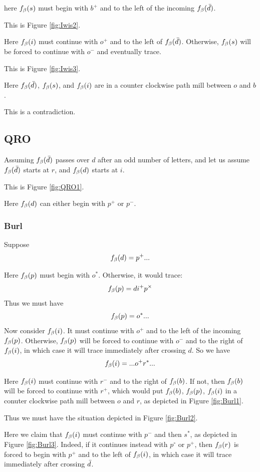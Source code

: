 here $f_\beta(s)$ must begin with $b^+$ and to the left of the incoming $f_\beta(\bar{d})$.

This is Figure \ref{fig:Iwis2}.

Here $f_\beta(i)$ must continue with $o^+$ and to the left of $f_\beta(\bar{d})$. Otherwise, $f_\beta(s)$ will be forced to continue with $o^-$ and eventually trace.

This is Figure \ref{fig:Iwis3}.

Here $f_\beta(\bar{d})$, $f_\beta(s)$, and $f_\beta(i)$ are in a counter clockwise path mill between $o$ and $b$.

This is a contradiction.


\subsection{QRO}\label{QRO}
Assuming $f_\beta(\bar{d})$ passes over $d$ after an odd number of letters, and let us assume $f_\beta(\bar{d})$ starts at $r$, and $f_\beta(d)$ starts at $i$.

This is Figure \ref{fig:QRO1}.

Here $f_\beta(d)$ can either begin with $p^+$ or $p^-$.

\subsubsection{Burl}\label{Burl}
Suppose 
\[
f_\beta(d) = p^+...
\]

Here $f_\beta(p)$ must begin with $o^*$. Otherwise, it would trace:
\[
f_\beta(p) = d i^+ p^\times
\]
Thus we must have
\[
f_\beta(p) = o^*...
\]
Now consider $f_\beta(i)$. It must continue with $o^+$ and to the left of the incoming $f_\beta(p)$. Otherwise, $f_\beta(p)$ will be forced to continue with $o^-$ and to the right of $f_\beta(i)$, in which case it will trace immediately after crossing $d$. So we have
\[
f_\beta(i) = ... o^+ r^*...
\]

Here $f_\beta(i)$ must continue with $r^-$ and to the right of $f_\beta(b)$. If not, then $f_\beta(b)$ will be forced to continue with $r^+$, which would put $f_\beta(b)$, $f_\beta(p)$, $f_\beta(i)$ in a conuter clockwise path mill between $o$ and $r$, as depicted in Figure \ref{fig:Burl1}.

Thus we must have the situation depicted in Figure \ref{fig:Burl2}.

Here we claim that $f_\beta(i)$ must continue with $p^-$ and then $s^*$, as depicted in Figure \ref{fig:Burl3}. Indeed, if it continues instead with $p^\circ$ or $p^+$, then $f_\beta(r)$ is forced to begin with $p^+$ and to the left of $f_\beta(i)$, in which case it will trace immediately after crossing $\bar{d}$.

